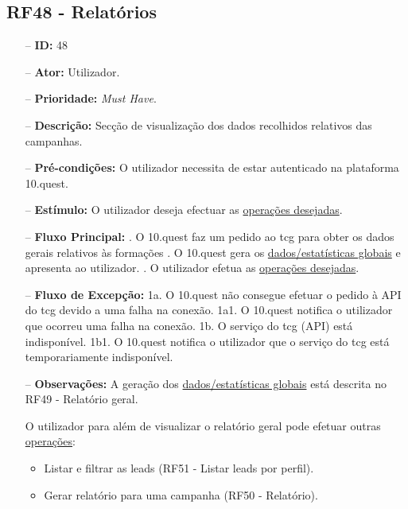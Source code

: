 \subsection{RF48 - Relatórios}
\begin{itemize}
	\item[--] \textbf{ID:} 48
	\item[--]  \textbf{Ator:} Utilizador.
	\item[--]  \textbf{Prioridade:} \textit{Must Have}.
	\item[--]  \textbf{Descrição:} Secção de visualização dos dados recolhidos relativos das campanhas. 
	\item[--]  \textbf{Pré-condições:} O utilizador necessita de estar autenticado na plataforma 10.quest.
	\item[--]  \textbf{Estímulo:} O utilizador deseja efectuar as \underline{operações desejadas}.
	\item[--]  \textbf{Fluxo Principal:} 
		. O 10.quest faz um pedido ao \acrshort{tcg} para obter os dados gerais relativos às formações
		. O 10.quest gera os \underline{dados/estatísticas globais} e apresenta ao utilizador.
		. O utilizador efetua as \underline{operações desejadas}.
	\item[--]  \textbf{Fluxo de Excepção:} 
		\subitem 1a. O 10.quest não consegue efetuar o pedido à API do \acrshort{tcg} devido a uma falha na conexão.
		\subitem 1a1. O 10.quest notifica o utilizador que ocorreu uma falha na conexão.
		\subitem 1b. O serviço do \acrshort{tcg} (API) está indisponível.
		\subitem 1b1. O 10.quest notifica o utilizador que o serviço do \acrshort{tcg} está temporariamente indisponível. 
	\item[--]  \textbf{Observações:} A geração dos \underline{dados/estatísticas globais} está descrita no RF49 - Relatório geral.
	
	O utilizador para além de visualizar o relatório geral pode efetuar outras \underline{operações}:
	\begin{itemize}
		\item Listar e filtrar as leads (RF51 - Listar leads por perfil).
		\item Gerar relatório para uma campanha (RF50 - Relatório).
	\end{itemize}
	
\end{itemize}
\newpage

